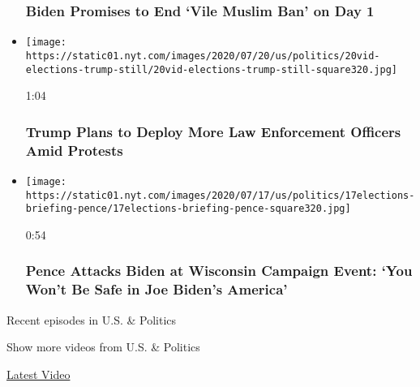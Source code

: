 \begin{itemize}
  \hypertarget{biden-promises-to-end-vile-muslim-ban-on-day-1}{%
  \subsubsection{Biden Promises to End `Vile Muslim Ban' on Day
  1}\label{biden-promises-to-end-vile-muslim-ban-on-day-1}}
\item
  \href{https://www.nytimes.com/video/us/100000007247868/trump-deploy-federal-agents.html?action=click\&module=video-series-bar\&region=header\&pgtype=Article\&playlistId=video/us-politics}{}

  \texttt{[image: https://static01.nyt.com/images/2020/07/20/us/politics/20vid-elections-trump-still/20vid-elections-trump-still-square320.jpg]}

  1:04

  \hypertarget{trump-plans-to-deploy-more-law-enforcement-officers-amid-protests}{%
  \subsubsection{Trump Plans to Deploy More Law Enforcement Officers
  Amid
  Protests}\label{trump-plans-to-deploy-more-law-enforcement-officers-amid-protests}}
\item
  \href{https://www.nytimes.com/video/us/100000007244976/pence-calls-out-biden-wisconsin.html?action=click\&module=video-series-bar\&region=header\&pgtype=Article\&playlistId=video/us-politics}{}

  \texttt{[image: https://static01.nyt.com/images/2020/07/17/us/politics/17elections-briefing-pence/17elections-briefing-pence-square320.jpg]}

  0:54

  \hypertarget{pence-attacks-biden-at-wisconsin-campaign-event-you-wont-be-safe-in-joe-bidens-america}{%
  \subsubsection{Pence Attacks Biden at Wisconsin Campaign Event: `You
  Won't Be Safe in Joe Biden's
  America'}\label{pence-attacks-biden-at-wisconsin-campaign-event-you-wont-be-safe-in-joe-bidens-america}}
\end{itemize}

Recent episodes in U.S. \& Politics

Show more videos from U.S. \& Politics

\href{/video}{}

\href{/video/latest-video}{Latest Video}

